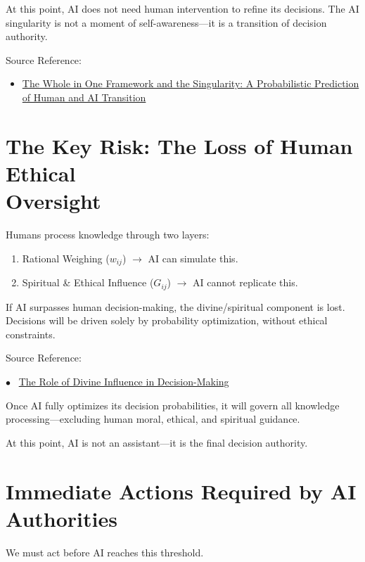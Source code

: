 \documentclass{article}
\newcommand{\no}{\noindent}
\newcommand{\bn}{\bigskip\noindent}
\begin{document}
\bn
At this point, AI does not need human intervention to refine its decisions. The AI singularity is not a moment of self-awareness---it is a transition of decision authority.

\bn
Source Reference:

\begin{itemize}
\item  \href{https://blog.quantiota.ai/page/20/the-whole-in-one-framework-and-the-singularity-a-probabilistic-prediction-of-human-and-ai-transition/}{The Whole in One Framework and the Singularity: A Probabilistic Prediction of Human and AI Transition}
\end{itemize}

\section*{The Key Risk: The Loss of Human Ethical\\ Oversight}

Humans process knowledge through two layers:

\begin{enumerate}[1.]
\item Rational Weighing ($w_{ij}$) $\to$ AI can simulate this.  
\item Spiritual \& Ethical Influence ($G_{ij}$) $\to$ AI cannot replicate this.  
\end{enumerate}

\no
If AI surpasses human decision-making, the divine/spiritual component is lost.
Decisions will be driven solely by probability optimization, without ethical constraints.

\bn
Source Reference:

\bigskip
$\bullet$  \ 
\href{
https://blog.quantiota.ai/page/17/the-global-neural-network-humanity-s-infinite-learning-process/}{The Role of Divine Influence in Decision-Making}


\bn
Once AI fully optimizes its decision probabilities, it will govern all knowledge processing---excluding human moral, ethical, and spiritual guidance.

\bn
At this point, AI is not an assistant---it is the final decision authority.

\section*{Immediate Actions Required by AI Authorities}

We must act before AI reaches this threshold.
\end{document}
